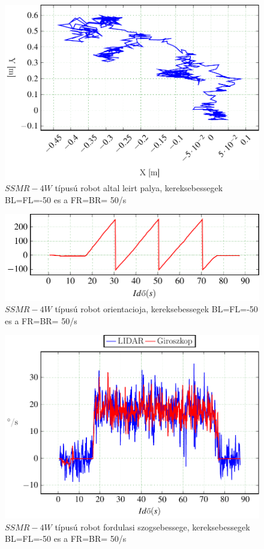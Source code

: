 \begin{figure}[H]
  \includegraphics{tikz/Left_n50Right50b.pdf}
  \caption{$SSMR-4W$ típusú robot altal leirt palya, kereksebessegek BL=FL=-50 es a FR=BR= 50\degree/s}
    \label{fig:Left_n50Right50b}
\end{figure}



\begin{figure}[H]
  \includegraphics{tikz/Left_n50Right50c.pdf}
  \caption{$SSMR-4W$ típusú robot orientacioja, kereksebessegek BL=FL=-50 es a FR=BR= 50\degree/s}
    \label{fig:Left_n50Right50c}
\end{figure}


\begin{figure}[H]
  \includegraphics{tikz/Left_n50Right50d.pdf}
  \caption{$SSMR-4W$ típusú robot fordulasi szogsebessege, kereksebessegek BL=FL=-50 es a FR=BR= 50\degree/s}
    \label{fig:Left_n50Right50d}
\end{figure}









